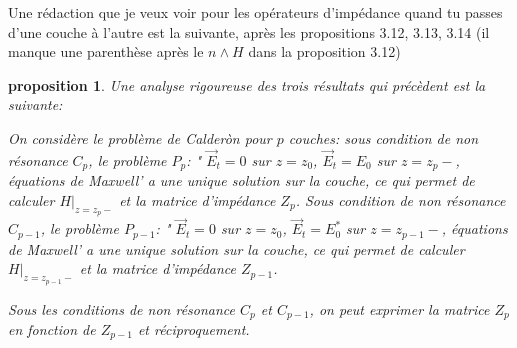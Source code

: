 \documentclass{article}
\newtheorem{proposition}{proposition}
\begin{document}
Une rédaction que je veux voir pour les opérateurs d'impédance quand tu passes d'une couche à l'autre est la suivante, après les propositions  3.12, 3.13, 3.14 (il manque une parenthèse après le $n\wedge H$ dans la proposition 3.12)
\begin{proposition}
Une analyse rigoureuse des trois résultats qui précèdent est la suivante:

On considère le problème de Calder\`on pour $p$ couches: sous condition de non résonance $C_p$, le problème $P_p$: " ${\vec E}_t=0$ sur $z=z_0$, ${\vec E}_t=E_0$ sur $z=z_p-$, équations de Maxwell'  a une unique solution sur la couche, ce qui permet de calculer $H\vert_{z=z_p-}$ et la matrice d'impédance $Z_{p}$. Sous condition de non résonance $C_{p-1}$, le problème $P_{p-1}$: " ${\vec E}_t=0$ sur $z=z_0$, ${\vec E}_t=E_0^*$ sur $z=z_{p-1}-$, équations de Maxwell'  a une unique solution sur la couche, ce qui permet de calculer $H\vert_{z=z_{p-1}-}$ et la matrice d'impédance $Z_{p-1}$.

Sous les conditions de non résonance $C_p$ et $C_{p-1}$, on peut exprimer la matrice $Z_p$ en fonction de $Z_{p-1}$ et réciproquement.


\end{proposition}



 
\end{document}
